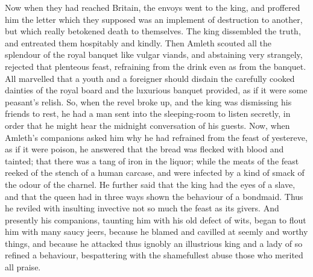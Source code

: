 \documentclass[10pt,a4paper]{report}
\begin{document}
Now when they had reached Britain, the envoys went to the king, and proffered him the letter which they supposed was an implement of destruction to another, but which really betokened death to themselves. The king dissembled the truth, and entreated them hospitably and kindly. Then Amleth scouted all the splendour of the royal banquet like vulgar viands, and abstaining very strangely, rejected that plenteous feast, refraining from the drink even as from the banquet. All marvelled that a youth and a foreigner should disdain the carefully cooked dainties of the royal board and the luxurious banquet provided, as if it were some peasant's relish. So, when the revel broke up, and the king was dismissing his friends to rest, he had a man sent into the sleeping-room to listen secretly, in order that he might hear the midnight conversation of his guests. Now, when Amleth's companions asked him why he had refrained from the feast of yestereve, as if it were poison, he answered that the bread was flecked with blood and tainted; that there was a tang of iron in the liquor; while the meats of the feast reeked of the stench of a human carcase, and were infected by a kind of smack of the odour of the charnel. He further said that the king had the eyes of a slave, and that the queen had in three ways shown the behaviour of a bondmaid. Thus he reviled with insulting invective not so much the feast as its givers. And presently his companions, taunting him with his old defect of wits, began to flout him with many saucy jeers, because he blamed and cavilled at seemly and worthy things, and because he attacked thus ignobly an illustrious king and a lady of so refined a behaviour, bespattering with the shamefullest abuse those who merited all praise.\\
\end{document}
